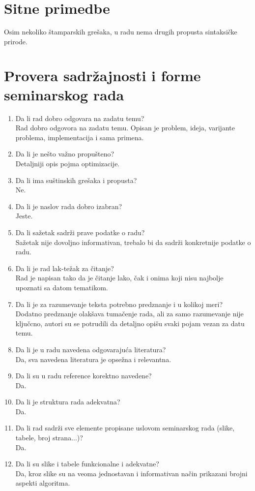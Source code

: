 \documentclass[a4paper]{report}
\begin{document}
\section{Sitne primedbe}
{Osim nekoliko štamparskih grešaka, u radu nema drugih propusta sintaksičke prirode.}


\section{Provera sadržajnosti i forme seminarskog rada}

\begin{enumerate}
\item Da li rad dobro odgovara na zadatu temu?\\
{Rad dobro odgovora na zadatu temu. Opisan je problem, ideja, varijante problema, implementacija i sama primena.}
\item Da li je nešto važno propušteno?\\
{Detaljniji opis pojma optimizacije.}
\item Da li ima suštinskih grešaka i propusta?\\
{Ne.}
\item Da li je naslov rada dobro izabran?\\ 
{ Jeste. }
\item Da li sažetak sadrži prave podatke o radu?\\ 
{Sažetak nije dovoljno informativan, trebalo bi da sadrži konkretnije podatke o radu. }
\item Da li je rad lak-težak za čitanje?\\ 
{Rad je napisan tako da je čitanje lako, čak i onima koji nisu najbolje upoznati sa datom tematikom.}
\item Da li je za razumevanje teksta potrebno predznanje i u kolikoj meri?\\
{Dodatno predznanje olakšava tumačenje rada, ali za samo razumevanje nije ključcno, autori su se potrudili da detaljno opišu svaki pojam vezan za datu temu.}
\item Da li je u radu navedena odgovarajuća literatura?\\ 
{Da, sva navedena literatura je opsežna i relevantna. }
\item Da li su u radu reference korektno navedene?\\ 
{Da.}
\item Da li je struktura rada adekvatna?\\
{Da.}
\item Da li rad sadrži sve elemente propisane uslovom seminarskog rada (slike, tabele, broj strana...)?\\
{Da.}
\item Da li su slike i tabele funkcionalne i adekvatne?\\
{Da, kroz slike su na veoma jednostavan i informativan način prikazani brojni aspekti algoritma.}
\end{enumerate}
\end{document}
